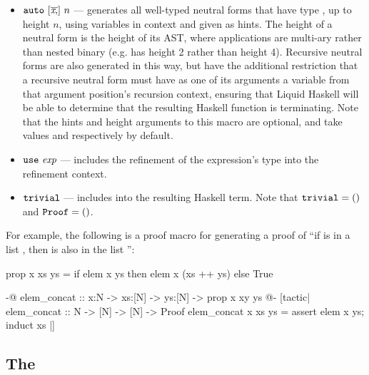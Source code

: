 \begin{itemize}
\begin{itemize}
    \item
    $\mathtt{auto} ~ [\overline{\textit{x} ,}] ~ n$ --- generates all well-typed neutral forms that have type , up to height $n$, using variables in context and given as hints. 
    The height of a neutral form is the height of its AST, where applications are multi-ary rather than nested binary (e.g.  has height 2 rather than height 4).
    Recursive neutral forms are also generated in this way, but have the additional restriction that a recursive neutral form must have as one of its arguments a variable from that argument position's recursion context, ensuring that Liquid Haskell will be able to determine that the resulting Haskell function is terminating.
    Note that the hints and height arguments to this macro are optional, and take values \LC{[]} and  respectively by default.
    \item $\mathtt{use} ~ \textit{exp}$ --- includes the refinement of the expression's type into the refinement context.
    \item $\mathtt{trivial}$ --- includes  into the resulting Haskell term. Note that $\mathtt{trivial} = \mathtt{()}$ and $\mathtt{Proof} = \mathtt{()}$.
  \end{itemize}
\end{itemize}

For example, the following is a proof macro for generating a proof of ``if  is in a list , then  is also in the list '':
\begin{code}
  prop x xs ys = if elem x ys then elem x (xs ++ ys) else True

  {-@ elem_concat :: x:N -> xs:[N] -> ys:[N] -> {prop x xy ys} @-}
  [tactic|
  elem_concat :: N -> [N] -> [N] -> Proof
  elem_concat x xs ys =
    assert {elem x ys};
    induct xs
  |]
\end{code}

\subsection{The \LangB}

